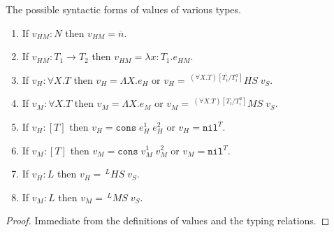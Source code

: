 \begin{lemma}
\label{cf}
\onehalfspacing
The possible syntactic forms of values of various types.
\begin{enumerate}
\item If $v_{HM}:N$ then $v_{HM}=\overline{n}$.
\item If $v_{HM}:T_{1}\rightarrow T_{2}$ then $v_{HM}=\lambda x:T_{1}.e_{HM}$.
\item If $v_{H}:\forall X.T$ then $v_{H}=\Lambda X.e_{H}$ or $v_{H}=\,^{(\forall X.T)[T_{i}/T_{i}^{a}]}HS\;v_{S}$.
\item If $v_{M}:\forall X.T$ then $v_{M}=\Lambda X.e_{M}$ or $v_{M}=\,^{(\forall X.T)[T_{i}/T_{i}^{a}]}MS\;v_{S}$.
\item If $v_{H}:[T]$ then $v_{H}=\mathtt{cons}\;e_{H}^{1}\;e_{H}^{2}$ or $v_{H}=\mathtt{nil}^{T}$.
\item If $v_{M}:[T]$ then $v_{M}=\mathtt{cons}\;v_{M}^{1}\;v_{M}^{2}$ or $v_{M}=\mathtt{nil}^{T}$.
\item If $v_{H}:L$ then $v_{H}=\,^{L}HS\;v_{S}$.
\item If $v_{M}:L$ then $v_{M}=\,^{L}MS\;v_{S}$.
\end{enumerate}
\begin{proof}
Immediate from the definitions of values and the typing relations.
\end{proof}
\end{lemma}